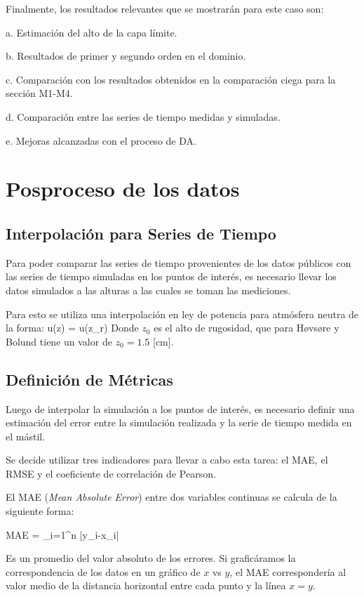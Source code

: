 Finalmente, los resultados relevantes que se mostrarán para este caso son:
\begin{enumerate*}
	\item[a.] Estimación del alto de la capa límite.
	\item[b.] Resultados de primer y segundo orden en el dominio.
	\item[c.] Comparación con los resultados obtenidos en la comparación ciega para la sección M1-M4.
	\item[d.] Comparación entre las series de tiempo medidas y simuladas.
	\item[e.] Mejoras alcanzadas con el proceso de DA. 
\end{enumerate*}
\newpage
\section{Posproceso de los datos}
\subsection{Interpolación para Series de Tiempo}
Para poder comparar las series de tiempo provenientes de los datos públicos con las series de tiempo simuladas en los puntos de interés, es necesario llevar los datos simulados a las alturas a las cuales se toman las mediciones.

Para esto se utiliza una interpolación en ley de potencia para atmósfera neutra de la forma:
\be 
u(z) = u(z_r)
\ee
Donde $z_0$ es el alto de rugosidad, que para Høvsøre y Bolund tiene un valor de $z_0=1.5$ [cm].
\subsection{Definición de Métricas}
Luego de interpolar la simulación a los puntos de interés, es necesario definir una estimación del error entre la simulación realizada y la serie de tiempo medida en el mástil.

Se decide utilizar tres indicadores para llevar a cabo esta tarea: el MAE, el RMSE y el coeficiente de correlación de Pearson.

El MAE (\emph{Mean Absolute Error}) entre dos variables continuas se calcula de la siguiente forma:

\be 
MAE = \sum_{i=1}^n |y_i-x_i|
\ee

Es un promedio del valor absoluto de los errores. Si graficáramos la correspondencia de los datos en un gráfico de $x$ vs $y$, el MAE correspondería al valor medio de la distancia horizontal entre cada punto y la línea $x=y$.

